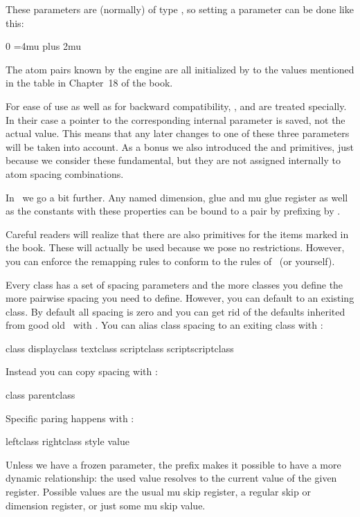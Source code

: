 These parameters are (normally) of type \type {\muskip}, so setting a parameter can
be done like this:

\starttyping
{} 0 \displaystyle=4mu plus 2mu %
\stoptyping

The atom pairs known by the engine are all initialized by  to the
values mentioned in the table in Chapter~18 of the \TEX book.

For ease of use as well as for backward compatibility, \typ {\thinmuskip}, \typ
{\medmuskip} and \typ {\thickmuskip} are treated specially. In their case a pointer
to the corresponding internal parameter is saved, not the actual \type {\muskip}
value. This means that any later changes to one of these three parameters will be
taken into account. As a bonus we also introduced the \typ {\tinymuskip} and \typ
{\pettymuskip} primitives, just because we consider these fundamental, but they
are not assigned internally to atom spacing combinations.

In \LUAMETATEX\ we go a bit further. Any named dimension, glue and mu glue
register as well as the constants with these properties can be bound to a pair by
prefixing \typ {\setmathspacing} by \type {\inherited}.

Careful readers will realize that there are also primitives for the items marked
\type {*} in the \TEX book. These will actually be used because we pose no
restrictions. However, you can enforce the remapping rules to conform to the
rules of \TEX\ (or yourself).

Every class has a set of spacing parameters and the more classes you define the more
pairwise spacing you need to define. However, you can default to an existing class.
By default all spacing is zero and you can get rid of the defaults inherited from
good old \TEX\ with \typ {\resetmathspacing}. You can alias class spacing to an exiting
class with :

\starttyping
{} class displayclass textclass scriptclass scriptscriptclass
\stoptyping

Instead you can copy spacing with \type {\copymathspacing}:

\starttyping
\copymathspacing class parentclass
\stoptyping

Specific paring happens with \type {\setmathspacing}:

\starttyping
\setmathspacing leftclass rightclass style value
\stoptyping

Unless we have a frozen parameter, the prefix \type {\inherited} makes it possible
to have a more dynamic relationship: the used value resolves to the current value
of the given register. Possible values are the usual mu skip register, a regular
skip or dimension register, or just some mu skip value.

